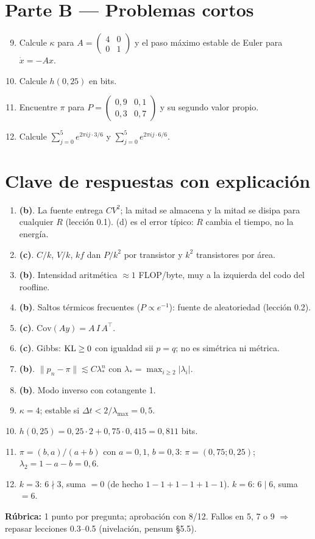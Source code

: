 \documentclass[11pt,a4paper]{article}
\begin{document}
\section*{Parte B — Problemas cortos}
\begin{enumerate}\setcounter{enumi}{8}
\item Calcule $\kappa$ para $A=\begin{pmatrix}4&0\\0&1\end{pmatrix}$ y el paso máximo estable de Euler para $\dot x=-Ax$.
\item Calcule $h(0{,}25)$ en bits.
\item Encuentre $\pi$ para $P=\begin{pmatrix}0{,}9&0{,}1\\0{,}3&0{,}7\end{pmatrix}$ y su segundo valor propio.
\item Calcule $\sum_{j=0}^{5}e^{2\pi ij\cdot 3/6}$ y $\sum_{j=0}^{5}e^{2\pi ij\cdot 6/6}$.
\end{enumerate}

\newpage
\section*{Clave de respuestas con explicación}
\begin{enumerate}
\item \textbf{(b)}. La fuente entrega $CV^2$; la mitad se almacena y la mitad se disipa para cualquier $R$ (lección 0.1). (d) es el error típico: $R$ cambia el tiempo, no la energía.
\item \textbf{(c)}. $C/k$, $V/k$, $kf$ dan $P/k^2$ por transistor y $k^2$ transistores por área.
\item \textbf{(b)}. Intensidad aritmética $\approx1$ FLOP/byte, muy a la izquierda del codo del roofline.
\item \textbf{(b)}. Saltos térmicos frecuentes ($P\propto e^{-1}$): fuente de aleatoriedad (lección 0.2).
\item \textbf{(c)}. $\mathrm{Cov}(Ay)=A\,I\,A^\top$.
\item \textbf{(c)}. Gibbs: $\operatorname{KL}\ge0$ con igualdad sii $p=q$; no es simétrica ni métrica.
\item \textbf{(b)}. $\|p_n-\pi\|\lesssim C\lambda_*^n$ con $\lambda_*=\max_{i\ge2}|\lambda_i|$.
\item \textbf{(b)}. Modo inverso con cotangente 1.
\item $\kappa=4$; estable si $\Delta t<2/\lambda_{\max}=0{,}5$.
\item $h(0{,}25)=0{,}25\cdot2+0{,}75\cdot0{,}415=0{,}811$ bits.
\item $\pi=(b,a)/(a+b)$ con $a=0{,}1$, $b=0{,}3$: $\pi=(0{,}75;0{,}25)$; $\lambda_2=1-a-b=0{,}6$.
\item $k=3$: $6\nmid3$, suma $=0$ (de hecho $1-1+1-1+1-1$). $k=6$: $6\mid6$, suma $=6$.
\end{enumerate}
\noindent\textbf{Rúbrica:} 1 punto por pregunta; aprobación con 8/12. Fallos en 5, 7 o 9 $\Rightarrow$ repasar lecciones 0.3--0.5 (nivelación, pensum §5.5).
\end{document}

